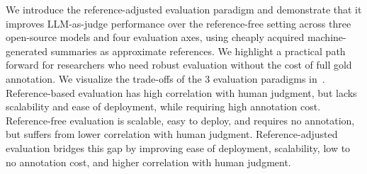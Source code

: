 We introduce the reference-adjusted evaluation paradigm and demonstrate that
it improves LLM-as-judge performance over the reference-free setting across
three open-source models and four evaluation axes, using cheaply acquired
machine-generated summaries as approximate references. We highlight a practical path forward for researchers who need robust evaluation without the cost of full gold annotation. We visualize the trade-offs of the 3 evaluation paradigms in~. Reference-based evaluation has high correlation with human judgment, but lacks scalability and ease of deployment, while requiring high annotation cost. Reference-free evaluation is scalable, easy to deploy, and requires no annotation, but suffers from lower correlation with human judgment. Reference-adjusted evaluation bridges this gap by improving ease of deployment, scalability, low to no annotation cost, and higher correlation with human judgment. 